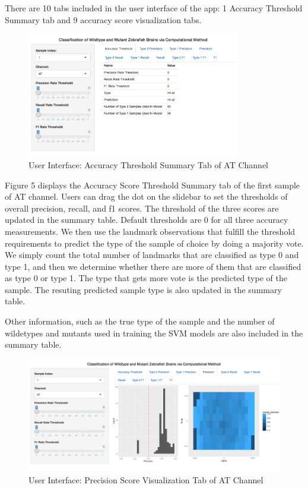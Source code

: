\documentclass[10pt,letterpaper]{article}
\begin{document}
There are 10 tabs included in the user interface of the app: 1 Accuracy
Threshold Summary tab and 9 accuracy score visualization tabs.

\begin{figure}[h]

{\centering \includegraphics[width=3.66in]{figures/shiny1} 

}

\caption{User Interface: Accuracy Threshold Summary Tab of AT Channel}\label{fig:shiny1}
\end{figure}

Figure 5 displays the Accuracy Score Threshold Summary tab of the first
sample of AT channel. Users can drag the dot on the slidebar to set the
thresholds of overall precision, recall, and f1 scores. The threshold of
the three scores are updated in the summary table. Default thresholds
are 0 for all three accuracy measurements. We then use the landmark
observations that fulfill the threshold requirements to predict the type
of the sample of choice by doing a majority vote. We simply count the
total number of landmarks that are classified as type 0 and type 1, and
then we determine whether there are more of them that are classified as
type 0 or type 1. The type that gets more vote is the predicted type of
the sample. The resuting predicted sample type is also updated in the
summary table.

Other information, such as the true type of the sample and the number of
wildetypes and mutants used in training the SVM models are also included
in the summary table.

\begin{figure}[h]

{\centering \includegraphics[width=4.92in]{figures/shiny2} 

}

\caption{User Interface: Precision Score Visualization Tab of AT Channel}\label{fig:shiny2}
\end{figure}
\end{document}
